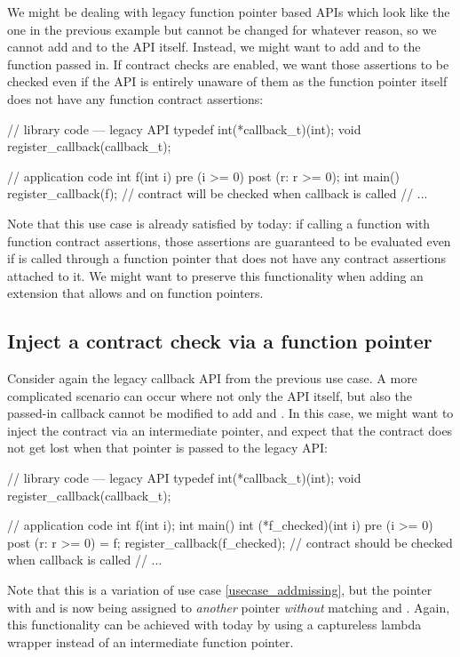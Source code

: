 We might be dealing with legacy function pointer based APIs which look like the one in the previous example but cannot be changed for whatever reason, so we cannot add  and  to the API itself. Instead, we might want to add  and  to the function passed in. If contract checks are enabled, we want those assertions to be checked even if the API is entirely unaware of them as the function pointer itself does not have any function contract assertions:
\begin{codeblock}
// library code --- legacy API
typedef int(*callback_t)(int);
void register_callback(callback_t);

// application code
int f(int i) pre (i >= 0) post (r: r >= 0); 
int main() {
  register_callback(f);  // contract will be checked when callback is called
  // ...
}
\end{codeblock}
Note that this use case is already satisfied by \cite{P2900R8} today: if calling a function  with function contract assertions, those assertions are guaranteed to be evaluated even if  is called through a function pointer that does not have any contract assertions attached to it. We might want to preserve this functionality when adding an extension that allows  and  on function pointers.


\subsection{Inject a contract check via a function pointer}
\label{usecase_inject}
Consider again the legacy callback API from the previous use case. A more complicated scenario can occur where not only the API itself, but also the passed-in callback  cannot be modified to add  and . In this case, we might want to inject the contract via an intermediate pointer, and expect that the contract does not get lost when that pointer is passed to the legacy API:
\begin{codeblock}
// library code --- legacy API
typedef int(*callback_t)(int);
void register_callback(callback_t);

// application code
int f(int i); 
int main() {
  int (*f_checked)(int i) pre (i >= 0) post (r: r >= 0) = f;
  register_callback(f_checked);  // contract should be checked when callback is called
  // ...
}
\end{codeblock}
Note that this is a variation of use case \ref{usecase_addmissing}, but the pointer with  and  is now being assigned to \emph{another} pointer \emph{without} matching  and . Again, this functionality can be achieved with \cite{P2900R8} today by using a captureless lambda wrapper instead of an intermediate function pointer.

